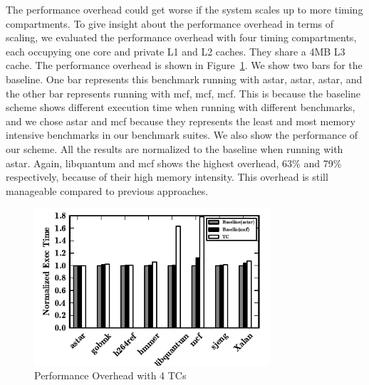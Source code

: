 The performance overhead could get worse if the system scales up to more timing compartments. To give insight
about the performance overhead in terms of scaling, we evaluated the performance overhead with four timing
compartments, each occupying one core and private L1 and L2 caches. They share a 4MB L3 cache. The performance
overhead is shown in Figure~\ref{fig:scalability}. We show two bars for the baseline. One bar represents this
benchmark running with {astar, astar, astar}, and the other bar represents running with {mcf, mcf, mcf}. This
is because the baseline scheme shows different execution time when running with different benchmarks, and we
chose astar and mcf because they represents the least and most memory intensive benchmarks in our benchmark
suites. We also show the performance of our scheme. All the results are normalized to the baseline when running
with astar. Again, libquantum and mcf shows the highest overhead, 63\% and 79\% respectively, because of their 
high memory intensity. This overhead is still manageable compared to previous approaches.

\begin{figure}
    \begin{center}
        \includegraphics[width=3.46in]{figs/scalability.pdf}
        \caption{Performance Overhead with 4 TCs}
        \label{fig:scalability}
    \end{center}
\end{figure}


